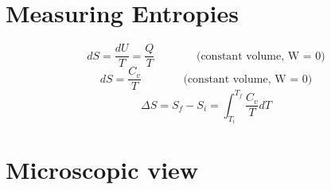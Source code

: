 \documentclass[twoside]{article}
\begin{document}
\section{Measuring Entropies}
\begin{equation} dS = \frac{dU}{T} = \frac{Q}{T}   ~~~~~~~~~~~~~~~~~ \text{(constant volume, W = 0)}\end{equation}
\begin{equation} dS = \frac{C_v}{T}   ~~~~~~~~~~~~~~~~~ \text{(constant volume, W = 0)}\end{equation}
\begin{equation} \Delta{S} = S_f-S_i = \int^{T_f}_{T_i} \frac{C_v}{T} dT \end{equation}

\section{Microscopic view}
\end{document}
